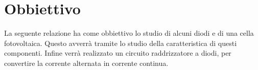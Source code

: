 \section*{Obbiettivo}

La seguente relazione ha come obbiettivo lo studio di alcuni diodi e di una cella fotovoltaica. Questo avverrà tramite
lo studio della caratteristica di questi componenti. Infine verrà realizzato un circuito raddrizzatore a diodi, per convertire
la corrente alternata in corrente continua.
